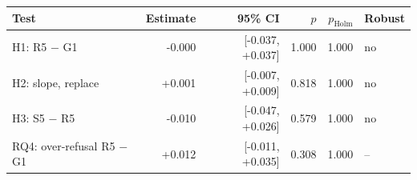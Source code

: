 \begin{tabular}{lrrrrl}
\toprule
Test & Estimate & 95\% CI & $p$ & $p_{\mathrm{Holm}}$ & Robust \\
\midrule
H1: R5 $-$ G1 & -0.000 & [-0.037, +0.037] & 1.000 & 1.000 & no \\
H2: slope, replace & +0.001 & [-0.007, +0.009] & 0.818 & 1.000 & no \\
H3: S5 $-$ R5 & -0.010 & [-0.047, +0.026] & 0.579 & 1.000 & no \\
RQ4: over-refusal R5 $-$ G1 & +0.012 & [-0.011, +0.035] & 0.308 & 1.000 & -- \\
\bottomrule
\end{tabular}

